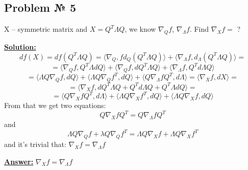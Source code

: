 \subsection{Problem № 5} 
X -- symmetric matrix and $X = Q^T \Lambda Q$, we know $\nabla_{Q} f$, $\nabla_{\Lambda}f$. Find $\nabla_X f = $ ?

\underline{\textbf{Solution:}} 
\begin{equation*}
    df(X) = d f(Q^T\Lambda Q) = \langle \nabla_{Q}, f d_Q (Q^T\Lambda Q) \rangle + \langle \nabla_{\Lambda}f, d_{\Lambda}(Q^T\Lambda Q) \rangle = 
\end{equation*}
\begin{equation*}
    = \langle \nabla_Q f,  Q^T\Lambda dQ \rangle + \langle \nabla_Q f, dQ^T\Lambda Q \rangle + \langle \nabla_{\Lambda}f,Q^T d\Lambda Q \rangle 
\end{equation*}
\begin{equation*}
    = \langle \Lambda Q \nabla_Q f, dQ \rangle + \langle \Lambda Q \nabla_Q f^T, dQ \rangle + \langle Q \nabla_{\Lambda} f Q^T, d \Lambda \rangle = \langle \nabla_X f, dX \rangle =
\end{equation*}
\begin{equation*}
    = \langle \nabla_X f, dQ^T \Lambda Q + Q^T d\Lambda Q + Q^T \Lambda dQ \rangle =
\end{equation*}
\begin{equation*}
 = \langle Q \nabla_X f Q^T, d \Lambda \rangle + \langle \Lambda Q \nabla_X f^T, dQ \rangle  + \langle \Lambda Q \nabla_X f, dQ \rangle
\end{equation*}
From that we get two equations:
$$
Q \nabla_X f Q^T = Q \nabla_{\Lambda} f Q^T
$$
and
$$
\Lambda Q \nabla_Q f + \lambda Q \nabla_Q f^T = \Lambda Q \nabla_X f + \Lambda Q \nabla_X f^T
$$
and it's trivial that: $\nabla_X f = \nabla_{\Lambda} f$

\underline{\textbf{Answer:}} $\nabla_X f = \nabla_{\Lambda} f$

